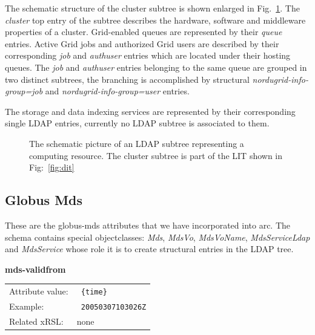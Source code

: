 \documentclass{article}
\begin{document}
The schematic structure of the cluster subtree is shown enlarged in 
Fig.~\ref{fig:dit_subcluster}. The {\it cluster} top entry of the 
subtree describes the hardware, software and middleware
properties of a cluster. Grid-enabled queues are represented by their 
{\it queue} entries. Active Grid jobs and authorized Grid users are 
described by their corresponding {\it job} and {\it authuser} 
entries which are located under their hosting queues.
The {\it job} and {\it authuser} entries belonging to the same 
queue are grouped in two distinct subtrees,
the branching is accomplished by structural {\it nordugrid-info-group=job} 
and {\it nordugrid-info-group=user} entries.

The storage and data indexing services are represented by their corresponding
single LDAP entries, currently no LDAP subtree is associated to them.

\begin{figure}[hb]
\centering
{ {} }
\caption{\label{fig:dit_subcluster} The schematic picture of an LDAP subtree representing a
computing resource. The cluster subtree is part of the LIT shown in Fig:~\ref{fig:dit}}
\end{figure} 


\subsection{Globus Mds}
These are the globus-mds attributes that we have incorporated into
arc.  The schema contains special objectclasses: {\it Mds}, 
{\it MdsVo}, {\it MdsVoName}, {\it MdsServiceLdap} and {\it MdsService}
whose role it is to create structural entries in the LDAP tree.

  \hspace*{0.5cm}
  \begin{shaded}
    \textbf{mds-validfrom}
  \end{shaded}
  \begin{tabular}{lp{10cm}}  
    Attribute value:&\verb# {time}#\\
    Example: &\verb# 20050307103026Z#\\
    Related xRSL:&none \\
  \end{tabular}
\end{document}
